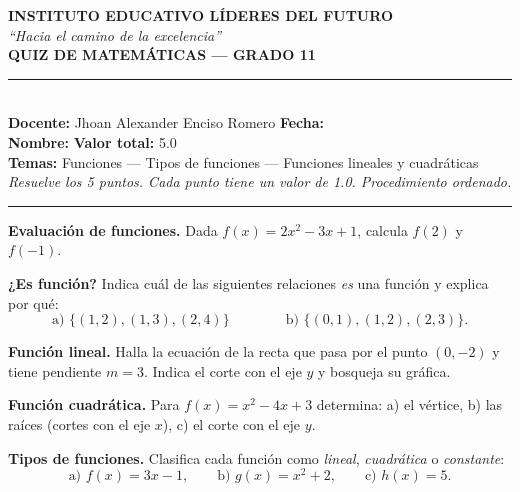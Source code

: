 \documentclass[11pt]{article}
\newcommand{\linea}[1]{\underline{\hspace{#1}}}
\newcommand{\encabezadoquiz}[2]{%
  \begin{center}
    {\large\bfseries INSTITUTO EDUCATIVO LÍDERES DEL FUTURO}\\[2pt]
    {\itshape\small ``Hacia el camino de la excelencia''}\\[5pt]
    {\Large\bfseries QUIZ DE MATEMÁTICAS --- GRADO #1}
  \end{center}
  \vspace{2pt}
  \noindent\rule{\textwidth}{0.8pt}\\[6pt]
  \noindent\textbf{Docente:} Jhoan Alexander Enciso Romero \hfill \textbf{Fecha:} \linea{3.2cm}\\[8pt]
  \noindent\textbf{Nombre:} \linea{9cm} \hfill \textbf{Valor total:} 5.0\\[6pt]
  \noindent\textbf{Temas:} #2\\[2pt]
  \noindent\textit{\small Resuelve los 5 puntos. Cada punto tiene un valor de 1.0. Procedimiento ordenado.}
  \par\vspace{4pt}\noindent\rule{\textwidth}{0.4pt}\par\vspace{8pt}
}
\begin{document}
\newpage

\encabezadoquiz{11\textdegree}{Funciones --- Tipos de funciones --- Funciones lineales y cuadráticas}

\begin{puntos}
  \item \textbf{Evaluación de funciones.} Dada $f(x)=2x^{2}-3x+1$, calcula $f(2)$ y $f(-1)$.

  \item \textbf{¿Es función?} Indica cuál de las siguientes relaciones \emph{es} una función y explica por qué:
        \[ \text{a) } \{(1,2),(1,3),(2,4)\} \qquad\qquad \text{b) } \{(0,1),(1,2),(2,3)\}. \]

  \item \textbf{Función lineal.} Halla la ecuación de la recta que pasa por el punto $(0,-2)$ y tiene pendiente $m=3$.
        Indica el corte con el eje $y$ y bosqueja su gráfica.

  \item \textbf{Función cuadrática.} Para $f(x)=x^{2}-4x+3$ determina:
        a) el vértice, \quad b) las raíces (cortes con el eje $x$), \quad c) el corte con el eje $y$.

  \item \textbf{Tipos de funciones.} Clasifica cada función como \emph{lineal}, \emph{cuadrática} o \emph{constante}:
        \[ \text{a) } f(x)=3x-1, \qquad \text{b) } g(x)=x^{2}+2, \qquad \text{c) } h(x)=5. \]
\end{puntos}
\end{document}

